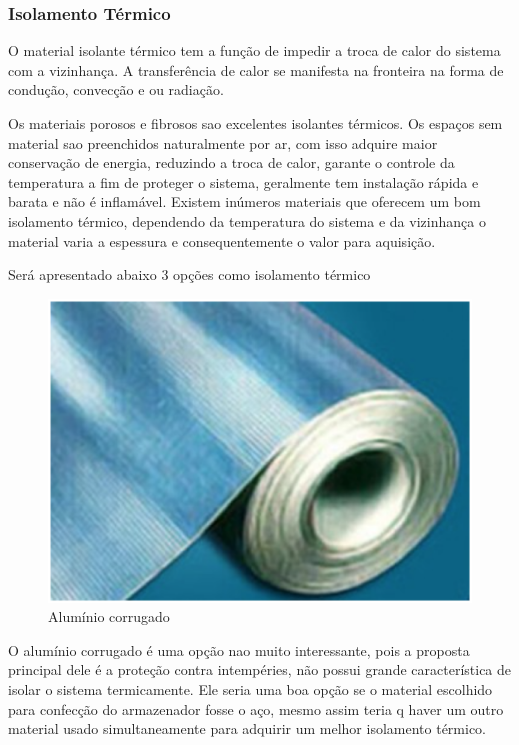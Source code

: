 \subsubsection{Isolamento Térmico}

O material isolante térmico tem a função de impedir a troca de calor do sistema com a vizinhança. A transferência de calor se manifesta na fronteira na forma de condução, convecção e ou radiação.

Os materiais porosos e fibrosos sao excelentes isolantes térmicos. Os espaços sem material sao preenchidos naturalmente por ar, com isso adquire maior conservação de energia, reduzindo a troca de calor, garante o controle da temperatura a fim de proteger o sistema, geralmente tem instalação rápida e barata e não é inflamável. Existem inúmeros materiais que oferecem um bom isolamento térmico, dependendo da temperatura do sistema e da vizinhança o material varia a espessura e consequentemente o valor para aquisição.

Será apresentado abaixo 3 opções como isolamento térmico


\begin{figure}[H]
 \centering
   \includegraphics[keepaspectratio=true,scale=0.8]{figuras/aluminio.eps}
 \caption{Alumínio corrugado}
 \label{aluminio}
\end{figure}

O alumínio corrugado é uma opção nao muito interessante, pois a proposta principal dele é a proteção contra intempéries, não possui grande característica de isolar o sistema termicamente. Ele seria uma boa opção se o material escolhido para confecção do armazenador fosse o aço, mesmo assim teria q haver um outro material usado simultaneamente para adquirir um melhor isolamento térmico.\cite{isar}

